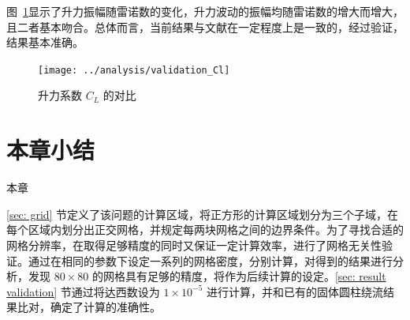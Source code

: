 图~\ref{fig: validation-Cl}显示了升力振幅随雷诺数的变化，升力波动的振幅均随雷诺数的增大而增大，且二者基本吻合。总体而言，当前结果与文献在一定程度上是一致的，经过验证，结果基本准确。

\begin{figure}[ht]
	\centering
	\texttt{[image: ../analysis/validation\_Cl]}
	\caption{升力系数 $C_L$ 的对比}
	\label{fig: validation-Cl}
\end{figure}

\section{本章小结}

本章

\ref{sec: grid} 节定义了该问题的计算区域，将正方形的计算区域划分为三个子域，在每个区域内划分出正交网格，并规定每两块网格之间的边界条件。为了寻找合适的网格分辨率，在取得足够精度的同时又保证一定计算效率，进行了网格无关性验证。通过在相同的参数下设定一系列的网格密度，分别计算，对得到的结果进行分析，发现 $80\times 80$ 的网格具有足够的精度，将作为后续计算的设定。\ref{sec: result validation} 节通过将达西数设为 $1\times 10^{-5}$ 进行计算，并和已有的固体圆柱绕流结果比对，确定了计算的准确性。
